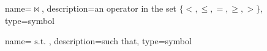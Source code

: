 	{%
		name=\ensuremath{\bowtie},
		description=an operator in the set \ensuremath{\{<, \leq, =, \geq, >\}},
		type=symbol
	}
	\newcommand{\relop}{\gls{sym:relop}}

	{%
		name={\ensuremath{\text{ s.t. }}},
		description=such that,
		type=symbol
	}
	\newcommand{\suchthat}{\gls{sym:suchthat}}
